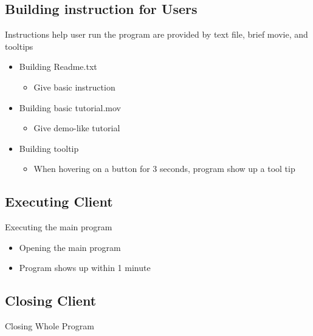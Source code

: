\documentclass[conference]{IEEEtran}
\begin{document}
\subsection{Building instruction for Users}
 Instructions help user run the program are provided by text file, brief movie, and tooltips

\begin{itemize}
  \item Building Readme.txt
  \begin{itemize}
    \item Give basic instruction
  \end{itemize}
  \item Building basic tutorial.mov
  \begin{itemize}
    \item Give demo-like tutorial
  \end{itemize}
  \item Building tooltip
  \begin{itemize}
    \item When hovering on a button for 3 seconds, program show up a tool tip
  \end{itemize}
\end{itemize}
\textit{ }


\subsection{Executing Client}
 Executing the main program 

\begin{itemize}
  \item Opening the main program
  \item Program shows up within 1 minute
\end{itemize}
\textit{ }


\subsection{Closing Client}
 Closing Whole Program 
\end{document}
